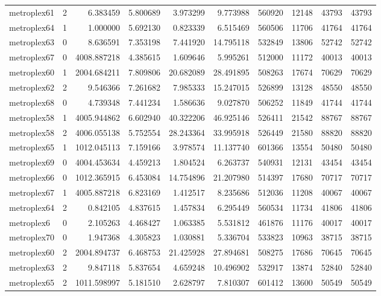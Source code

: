 \begin{longtable}{|l|r|r|r|r|r|r|r|r|r|}
metroplex61 & 2 & 6.383459 & 5.800689 & 3.973299 & 9.773988 & 560920 & 12148 & 43793 & 43793 \\
metroplex64 & 1 & 1.000000 & 5.692130 & 0.823339 & 6.515469 & 560506 & 11706 & 41764 & 41764 \\
metroplex63 & 0 & 8.636591 & 7.353198 & 7.441920 & 14.795118 & 532849 & 13806 & 52742 & 52742 \\
metroplex67 & 0 & 4008.887218 & 4.385615 & 1.609646 & 5.995261 & 512000 & 11172 & 40013 & 40013 \\
metroplex60 & 1 & 2004.684211 & 7.809806 & 20.682089 & 28.491895 & 508263 & 17674 & 70629 & 70629 \\
metroplex62 & 2 & 9.546366 & 7.261682 & 7.985333 & 15.247015 & 526899 & 13128 & 48550 & 48550 \\
metroplex68 & 0 & 4.739348 & 7.441234 & 1.586636 & 9.027870 & 506252 & 11849 & 41744 & 41744 \\
metroplex58 & 1 & 4005.944862 & 6.602940 & 40.322206 & 46.925146 & 526411 & 21542 & 88767 & 88767 \\
metroplex58 & 2 & 4006.055138 & 5.752554 & 28.243364 & 33.995918 & 526449 & 21580 & 88820 & 88820 \\
metroplex65 & 1 & 1012.045113 & 7.159166 & 3.978574 & 11.137740 & 601366 & 13554 & 50480 & 50480 \\
metroplex69 & 0 & 4004.453634 & 4.459213 & 1.804524 & 6.263737 & 540931 & 12131 & 43454 & 43454 \\
metroplex66 & 0 & 1012.365915 & 6.453084 & 14.754896 & 21.207980 & 514397 & 17680 & 70717 & 70717 \\
metroplex67 & 1 & 4005.887218 & 6.823169 & 1.412517 & 8.235686 & 512036 & 11208 & 40067 & 40067 \\
metroplex64 & 2 & 0.842105 & 4.837615 & 1.457834 & 6.295449 & 560534 & 11734 & 41806 & 41806 \\
metroplex6 & 0 & 2.105263 & 4.468427 & 1.063385 & 5.531812 & 461876 & 11176 & 40017 & 40017 \\
metroplex70 & 0 & 1.947368 & 4.305823 & 1.030881 & 5.336704 & 533823 & 10963 & 38715 & 38715 \\
metroplex60 & 2 & 2004.894737 & 6.468753 & 21.425928 & 27.894681 & 508275 & 17686 & 70645 & 70645 \\
metroplex63 & 2 & 9.847118 & 5.837654 & 4.659248 & 10.496902 & 532917 & 13874 & 52840 & 52840 \\
metroplex65 & 2 & 1011.598997 & 5.181510 & 2.628797 & 7.810307 & 601412 & 13600 & 50549 & 50549 \\

\end{longtable}
